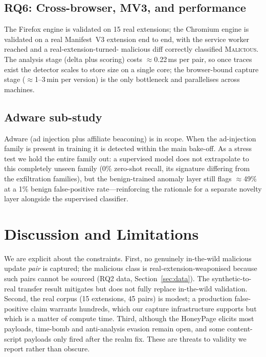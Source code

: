 \documentclass[conference]{IEEEtran}
\begin{document}
\subsection{RQ6: Cross-browser, MV3, and performance}
The Firefox engine is validated on 15 real extensions; the Chromium engine is validated on a real
Manifest~V3 extension end to end, with the service worker reached and a real-extension-turned-
malicious diff correctly classified \textsc{Malicious}. The analysis stage (delta plus scoring)
costs $\approx$0.22\,ms per pair, so once traces exist the detector scales to store size on a
single core; the browser-bound capture stage ($\approx$1--3\,min per version) is the only
bottleneck and parallelises across machines.

\subsection{Adware sub-study}
Adware (ad injection plus affiliate beaconing) is in scope. When the ad-injection family is
present in training it is detected within the main bake-off. As a stress test we hold the entire
family out: a supervised model does not extrapolate to this completely unseen family (0\% zero-shot
recall, its signature differing from the exfiltration families), but the benign-trained anomaly
layer still flags $\approx$49\% at a 1\% benign false-positive rate---reinforcing the rationale for
a separate novelty layer alongside the supervised classifier.

\section{Discussion and Limitations}
We are explicit about the constraints. First, no genuinely in-the-wild malicious update
\emph{pair} is captured; the malicious class is real-extension-weaponised because such pairs
cannot be sourced (RQ2 data, Section~\ref{sec:data}). The synthetic-to-real transfer result
mitigates but does not fully replace in-the-wild validation. Second, the real corpus (15
extensions, 45 pairs) is modest; a production false-positive claim warrants hundreds, which our
capture infrastructure supports but which is a matter of compute time. Third, although the
HoneyPage elicits most payloads, time-bomb and anti-analysis evasion remain open, and some
content-script payloads only fired after the realm fix. These are threats to validity we report
rather than obscure.
\end{document}
